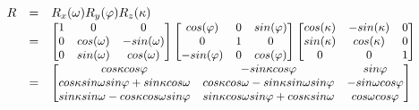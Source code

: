 \begin{equation}
  \begin{array}{lll}
    R & = & R_{x}(\omega) R_{y}(\varphi) R_{z}(\kappa) \\
    & = &
      \begin{small}
      \left[ 
        \begin{matrix} 
          1 & 0           & 0 \\
          0 & cos(\omega) & -sin(\omega) \\
          0 & sin(\omega) & cos(\omega)
        \end{matrix} 
      \right] 
      \left[ 
        \begin{matrix} 
          cos(\varphi)  & 0 & sin(\varphi) \\
          0             & 1 & 0 \\
          -sin(\varphi) & 0 & cos(\varphi)
        \end{matrix} 
      \right] 
      \left[ 
        \begin{matrix} 
          cos(\kappa) & -sin(\kappa) & 0 \\
          sin(\kappa) & cos(\kappa)  & 0 \\
          0           & 0            & 1
        \end{matrix} 
      \right] 
      \end{small} \\
    & = &
      \begin{small}
        \left[ 
          \begin{matrix} 
            cos \kappa cos \varphi  
              & -sin \kappa cos \varphi  
              & sin \varphi  \\
        
            cos \kappa sin \omega sin \varphi  + sin \kappa cos \omega 
              & cos \kappa cos \omega  - sin \kappa sin \omega sin \varphi 
              & -sin \omega cos \varphi  \\
        
            sin \kappa sin \omega  - cos \kappa cos \omega sin \varphi 
              & sin \kappa cos \omega sin \varphi  + cos \kappa sin \omega  
              & cos \omega cos \varphi 
          \end{matrix} 
        \right] 
      \end{small}
  \end{array}
  \label{eq:idp2}
\end{equation}